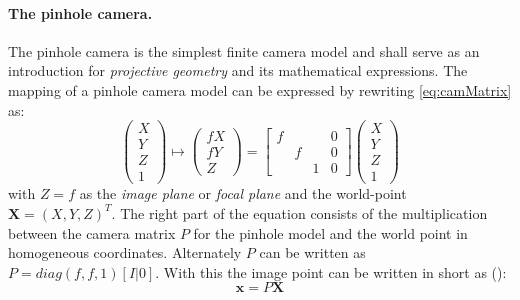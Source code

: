 \paragraph{The pinhole camera.} The pinhole camera is the simplest finite camera model and shall serve as an introduction for \textit{projective geometry} and its mathematical expressions. The mapping of a pinhole camera model can be expressed by rewriting \autoref{eq:camMatrix} as:
\begin{equation} 
 \begin{pmatrix}
  X \\
  Y \\
  Z \\
  1
 \end{pmatrix}\longmapsto
 \begin{pmatrix}
  fX \\
  fY \\
  Z
 \end{pmatrix}=
 \begin{bmatrix}
  f & & & 0\\
   & f & & 0 \\
   &  & 1 & 0
 \end{bmatrix}
 \begin{pmatrix}
  X \\
  Y \\
  Z \\
  1
 \end{pmatrix}
\end{equation}
with $Z = f$ as the \textit{image plane} or \textit{focal plane} and the world-point $\mathbf{X}=(X,Y,Z)^T$. The right part of the equation consists of the multiplication between the camera matrix $P$ for the pinhole model and the world point in homogeneous coordinates. Alternately $P$ can be written as $P=diag(f,f,1)[ I | 0]$. With this the image point can be written in short as (\cite[p.153 et seq.]{Hartley.2011}):
\begin{equation}
 \mathbf{x}=P\mathbf{X}
\end{equation}

